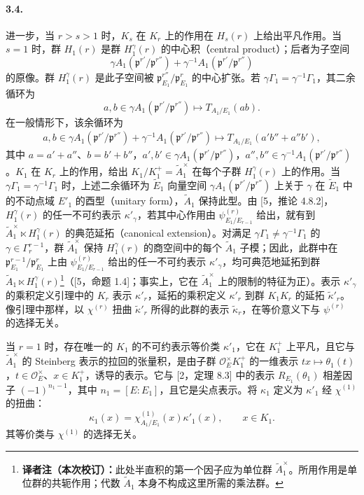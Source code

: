 \paragraph*{3.4.}进一步，当 $r>s>1$ 时，$K_s$ 在 $K_r$ 上的作用在 $H_s(r)$ 上给出平凡作用。当 $s=1$ 时，群 $H_1(r)$ 是群 $H_1^\gamma(r)$ 的中心积（central product）；后者为子空间
\[
\gamma A_1(\mathfrak p^{r'}/\mathfrak p^{r''})+\gamma^{-1}A_1(\mathfrak p^{r'}/\mathfrak p^{r''})
\]
的原像。群 $H_1^\gamma(r)$ 是此子空间被 $\mathfrak p_{E_1}^{r''}/\mathfrak p_{E_1}^r$ 的中心扩张。若 $\gamma\Gamma_1=\gamma^{-1}\Gamma_1$，其二余循环为
\[
a,b\in\gamma A_1(\mathfrak p^{r'}/\mathfrak p^{r''})\longmapsto T_{A_1/E_1}(ab).
\]
在一般情形下，该余循环为
\[
\begin{aligned}
a,b\in\gamma A_1(\mathfrak p^{r'}/\mathfrak p^{r''})+\gamma^{-1}A_1(\mathfrak p^{r'}/\mathfrak p^{r''})
\longmapsto T_{A_1/E_1}(a'b''+a''b'),
\end{aligned}
\]
其中 $a=a'+a''$、$b=b'+b''$，$a',b'\in\gamma A_1(\mathfrak p^{r'}/\mathfrak p^{r''})$，$a'',b''\in\gamma^{-1}A_1(\mathfrak p^{r'}/\mathfrak p^{r''})$。$K_1$ 在 $K_r$ 上的作用，给出 $K_1/K_1^+=\widetilde A_1^\times$ 在每个子群 $H_1^\gamma(r)$ 上的作用。当 $\gamma\Gamma_1=\gamma^{-1}\Gamma_1$ 时，上述二余循环为 $\widetilde E_1$ 向量空间 $\gamma A_1(\mathfrak p^{r'}/\mathfrak p^{r''})$ 上关于 $\gamma$ 在 $\widetilde E_1$ 中的不动点域 $E'_1$ 的酉型（unitary form），$\widetilde A_1$ 保持此型。由 [5，推论 4.8.2]，$H_1^\gamma(r)$ 的任一不可约表示 $\kappa'_\gamma$，若其中心作用由 $\psi_{E_1/E_{r-1}}^{(r)}$ 给出，就有到 $\widetilde A_1^\times\ltimes H_1^\gamma(r)$ 的典范延拓（canonical extension）。对满足 $\gamma\Gamma_1\ne\gamma^{-1}\Gamma_1$ 的 $\gamma\in\Gamma_r^{r-1}$，群 $\widetilde A_1^\times$ 保持 $H_1^\gamma(r)$ 的商空间中的每个 $\widetilde A_1$ 子模；因此，此群中在 $\mathfrak p_{E_1}^{r-1}/\mathfrak p_{E_1}^r$ 上由 $\psi_{E_1/E_{r-1}}^{(r)}$ 给出的任一不可约表示 $\kappa'_\gamma$，均可典范地延拓到群 $\widetilde A_1\ltimes H_1^\gamma(r)$\footnote{\textbf{译者注（本次校订）：}此处半直积的第一个因子应为单位群 $\widetilde A_1^\times$。所用作用是单位群的共轭作用；代数 $\widetilde A_1$ 本身不构成这里所需的乘法群。}（[5，命题 1.4]；事实上，它在 $\widetilde A_1^\times$ 上的限制的特征为正）。表示 $\kappa'_\gamma$ 的乘积定义引理中的 $K_r$ 表示 $\kappa'_r$，延拓的乘积定义 $\kappa'_r$ 到群 $K_1K_r$ 的延拓 $\widetilde\kappa'_r$。像引理中那样，以 $\chi^{(r)}$ 扭曲 $\widetilde\kappa'_r$ 所得的此群的表示 $\widetilde\kappa_r$，在等价意义下与 $\psi^{(r)}$ 的选择无关。

当 $r=1$ 时，存在唯一的 $K_1$ 的不可约表示等价类 $\kappa'_1$，它在 $K_1^+$ 上平凡，且它与 $\widetilde A_1^\times$ 的 Steinberg 表示的拉回的张量积，是由子群 $\mathcal O_E^\times K_1^+$ 的一维表示 $tx\mapsto\theta_1(t)$，$t\in\mathcal O_E^\times$、$x\in K_1^+$，诱导的表示。它与 [2，定理 8.3] 中的表示 $R_{E_1}(\theta_1)$ 相差因子 $(-1)^{n_1-1}$，其中 $n_1=[E:E_1]$，且它是尖点表示。将 $\kappa_1$ 定义为 $\kappa'_1$ 经 $\chi^{(1)}$ 的扭曲：
\[
\kappa_1(x)=\chi_{A_1/E_1}^{(1)}(x)\kappa'_1(x),\qquad x\in K_1.
\]
其等价类与 $\chi^{(1)}$ 的选择无关。

